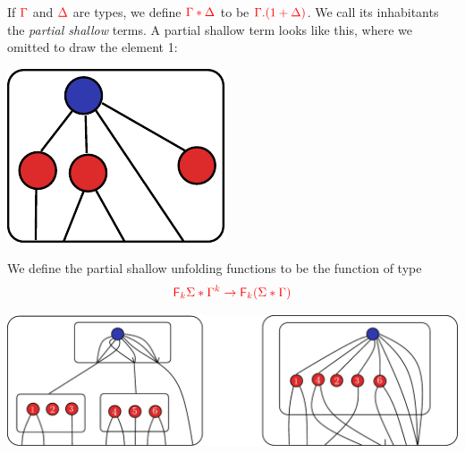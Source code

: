 \noindent\begin{example}\label{ex:partial-shallow-unfold} If ${\color{red}{\Gamma}}$ and ${\color{red}{\Delta}}$ are types, we define ${\color{red}{\Gamma*\Delta}}$ to be ${\color{red}{\Gamma.(1+\Delta)}}$. We call its inhabitants the \emph{partial shallow} terms. A partial shallow term looks like this, where we omitted to draw the element 1:
\begin{center}
\includegraphics[scale=.4]{partial-shallow-term.pdf}
\end{center}
We define the partial shallow unfolding functions to be the function of type
\begin{align*}
{\color{red}{{{\color{red}{\mathsf F_{k}}}\Sigma}*{\Gamma^k} \to {\color{red}{\mathsf F_{k}}}({\Sigma}*{\Gamma})}} 
\end{align*}
 \begin{center}
\includegraphics[scale=.4]{partial-shallow-unfold.pdf}
 \end{center}
\end{example}

